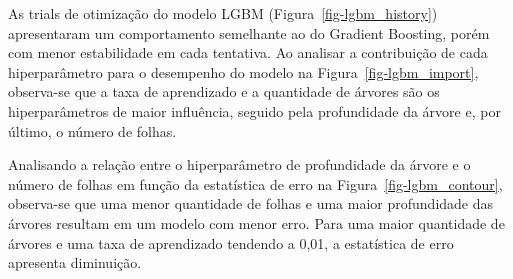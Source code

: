 \documentclass[
  12pt,
  a4paper,
]{scrreprt}
\begin{document}
\vspace{12pt}

As trials de otimização do modelo LGBM (Figura~\ref{fig-lgbm_history})
apresentaram um comportamento semelhante ao do Gradient Boosting, porém
com menor estabilidade em cada tentativa. Ao analisar a contribuição de
cada hiperparâmetro para o desempenho do modelo na
Figura~\ref{fig-lgbm_import}, observa-se que a taxa de aprendizado e a
quantidade de árvores são os hiperparâmetros de maior influência,
seguido pela profundidade da árvore e, por último, o número de folhas.

\vspace{12pt}

Analisando a relação entre o hiperparâmetro de profundidade da árvore e
o número de folhas em função da estatística de erro na
Figura~\ref{fig-lgbm_contour}, observa-se que uma menor quantidade de
folhas e uma maior profundidade das árvores resultam em um modelo com
menor erro. Para uma maior quantidade de árvores e uma taxa de
aprendizado tendendo a 0,01, a estatística de erro apresenta diminuição.
\end{document}
